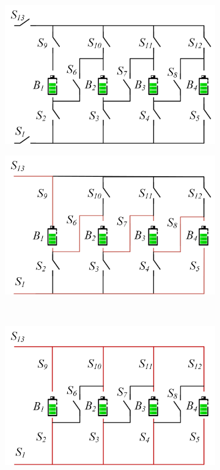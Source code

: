 \documentclass{article}
\begin{document}
\begin{figure}[htbp]
    \centering
    \begin{subfigure}[b]{0.45\textwidth}
        \includegraphics[width=\textwidth]{stru-V-origin.png}
        \caption{}
        \label{fig:stru-Visairo}
    \end{subfigure}
    \hspace{0.05\textwidth}
    \begin{subfigure}[b]{0.45\textwidth}
        \includegraphics[width=\textwidth]{stru-V-serial.png}
        \caption{}
        \label{fig:stru-Visairo-serial}
    \end{subfigure}
    \\
    \begin{subfigure}[b]{0.45\textwidth}
        \includegraphics[width=\textwidth]{stru-V-parallel.png}

\end{subfigure}
\end{figure}
\end{document}
